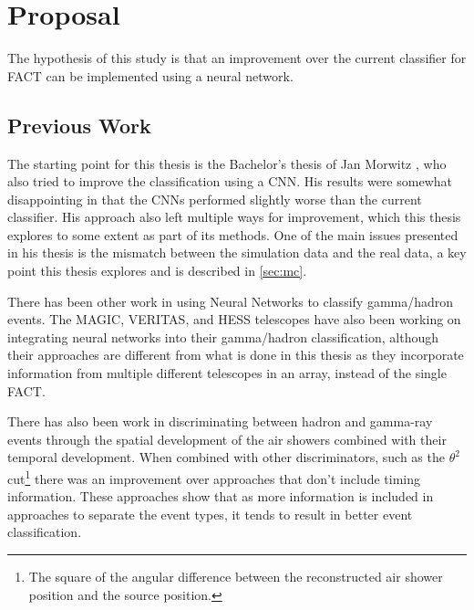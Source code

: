 \documentclass[12pt]{article}
\begin{document}
\section{Proposal}\label{sec:proposal}

The hypothesis of this study is that an improvement over the current classifier for FACT can be implemented using a neural network.

\subsection{Previous Work}\label{sec:previous}

The starting point for this thesis is the Bachelor's thesis of Jan Morwitz \cite{behnken_2017}, who also tried to improve the classification using a CNN. His results were somewhat disappointing in that the CNNs performed slightly worse than the current classifier. His approach also left multiple ways for improvement, which this thesis explores to some extent as part of its methods. One of the main issues presented in his thesis is the mismatch between the simulation data and the real data, a key point this thesis explores and is described in \ref{sec:mc}.

There has been other work in using Neural Networks to classify gamma/hadron events. The MAGIC, VERITAS, and HESS telescopes have also been working on integrating neural networks into their gamma/hadron classification\cite{2006APh....25..380K, boinee2006neural, murach2015neural}, although their approaches are different from what is done in this thesis as they incorporate information from multiple different telescopes in an array, instead of the single FACT.

There has also been work in discriminating between hadron and gamma-ray events through the spatial development of the air showers combined with their temporal development. When combined with other discriminators, such as the $\theta^2$ cut\footnote{The square of the angular difference between the reconstructed air shower position and the source position.} there was an improvement over approaches that don't include timing information\cite{prokoph2009investigations}. These approaches show that as more information is included in approaches to separate the event types, it tends to result in better event classification.
\end{document}
